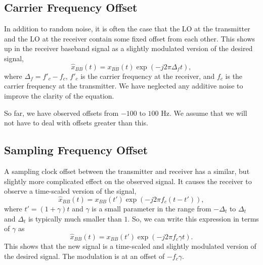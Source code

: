 \documentclass[conference]{IEEEtran}
\begin{document}
\subsection*{Carrier Frequency Offset}
In addition to random noise, it is often the case that the LO at the
transmitter and the LO at the receiver contain some fixed offset from
each other. This shows up in the receiver baseband signal as a slightly
modulated version of the desired signal,
\begin{equation}
\hat{x}_{BB}(t) = x_{BB}(t) \exp\left(-j 2 \pi \Delta_f t\right),
\end{equation}
where $\Delta_f = f'_c - f_c$, $f'_c$ is the carrier frequency
at the receiver, and $f_c$ is the carrier frequency at the transmitter.
We have neglected any additive noise to improve the clarity of the
equation.

So far, we have observed offsets from $-100$ to $100$ Hz. We assume
that we will not have to deal with offsets greater than this.

\subsection*{Sampling Frequency Offset}
A sampling clock offset between the transmitter and receiver has a
similar, but slightly more complicated effect on the observed signal.
It causes the receiver to observe a time-scaled version of the signal,
\begin{equation}
\hat{x}_{BB}(t) = x_{BB}(t') \exp\left(-j 2 \pi f_c \left(t - t'\right)\right),
\end{equation}
where $t' = (1 + \gamma) t$ and $\gamma$ is a small parameter in the
range from $-\Delta_t$ to $\Delta_t$ and $\Delta_t$ is typically much
smaller than $1$. So, we can write this expression in terms of $\gamma$
as
\begin{equation}
\hat{x}_{BB}(t) = x_{BB}(t') \exp\left(-j 2 \pi f_c \gamma t\right).
\end{equation}
This shows that the new signal is a time-scaled and slightly modulated
version of the desired signal. The modulation is at an offset of $-f_c \gamma$.
\end{document}
